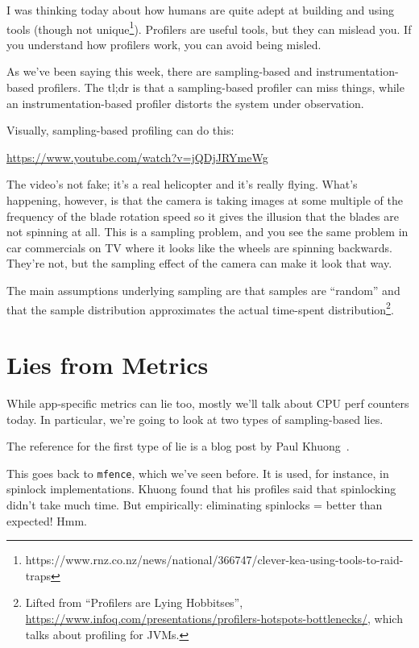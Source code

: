 




I was thinking today about how humans are quite adept at building and
using tools (though not
unique\footnote{https://www.rnz.co.nz/news/national/366747/clever-kea-using-tools-to-raid-traps}). Profilers
are useful tools, but they can mislead you.  If you understand how
profilers work, you can avoid being misled.

As we've been saying this week, there are sampling-based and instrumentation-based profilers.
The tl;dr is that a sampling-based profiler can miss things, while an instrumentation-based
profiler distorts the system under observation.

Visually, sampling-based profiling can do this:
\begin{center}
	\url{https://www.youtube.com/watch?v=jQDjJRYmeWg}
\end{center}

The video's not fake; it's a real helicopter and it's really flying. What's happening, however, is that the camera is taking images at some multiple of the frequency of the blade rotation speed so it gives the illusion that the blades are not spinning at all. This is a sampling problem, and you see the same problem in car commercials on TV where it looks like the wheels are spinning backwards. They're not, but the sampling effect of the camera can make it look that way.

The main assumptions underlying sampling are that samples are ``random'' and that the sample distribution approximates the actual time-spent distribution\footnote{Lifted from ``Profilers are Lying Hobbitses'', \url{https://www.infoq.com/presentations/profilers-hotspots-bottlenecks/}, which talks about profiling for JVMs.}.

\section*{Lies from Metrics}
While app-specific metrics can lie too, mostly we'll talk about CPU
perf counters today.
In particular, we're going to look at two types of sampling-based lies.

The reference for the first type of lie is a blog post by Paul Khuong~\cite{metrics}.

This goes back to {\tt mfence}, which we've seen before. It is used, for instance, in
spinlock implementations. Khuong found that his profiles said that spinlocking didn't take much time.
But empirically: eliminating spinlocks = better than expected! Hmm.


